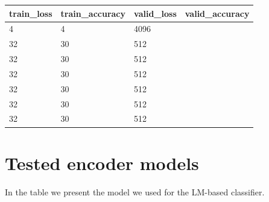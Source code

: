 \documentclass[11pt]{article}
\begin{document}
	\begin{table}[]
		\begin{tabular}{@{}llll@{}}
			\toprule
			\multicolumn{1}{|l|}{train\_loss} & \multicolumn{1}{l|}{train\_accuracy} & \multicolumn{1}{l|}{valid\_loss} & \multicolumn{1}{l|}{valid\_accuracy} \\ \midrule
			4                                 & 4                                    & 4096                             &                                      \\
			32                                & 30                                   & 512                              &                                      \\
			32                                & 30                                   & 512                              &                                      \\
			32                                & 30                                   & 512                              &                                      \\
			32                                & 30                                   & 512                              &                                      \\
			32                                & 30                                   & 512                              &                                      \\
			32                                & 30                                   & 512                              &                                      \\ \cmidrule(r){1-3}
		\end{tabular}
	\end{table}
	
	\section{Tested encoder models}
	\label{sec:appendix}
	
	In the table we present the model we used for the LM-based classifier. 
	
\end{document}
